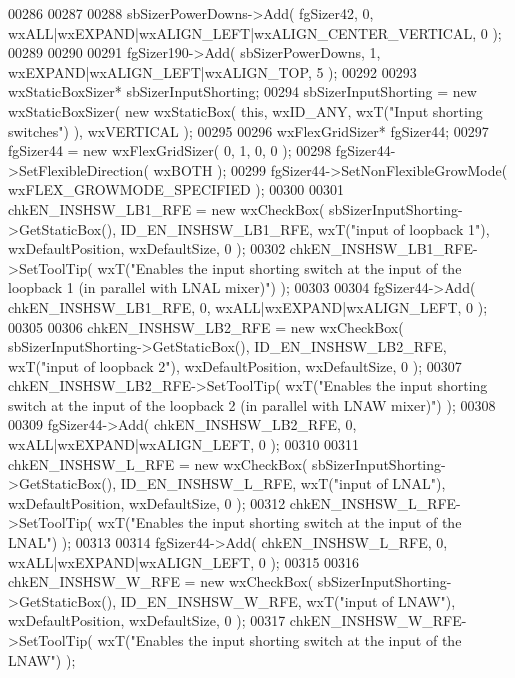 \begin{DoxyCode}
00286     
00287     
00288     sbSizerPowerDowns->Add( fgSizer42, 0, wxALL|wxEXPAND|wxALIGN\_LEFT|wxALIGN\_CENTER\_VERTICAL, 0 );
00289     
00290     
00291     fgSizer190->Add( sbSizerPowerDowns, 1, wxEXPAND|wxALIGN\_LEFT|wxALIGN\_TOP, 5 );
00292     
00293     wxStaticBoxSizer* sbSizerInputShorting;
00294     sbSizerInputShorting = \textcolor{keyword}{new} wxStaticBoxSizer( \textcolor{keyword}{new} wxStaticBox( \textcolor{keyword}{this}, wxID\_ANY, wxT(\textcolor{stringliteral}{"Input shorting
       switches"}) ), wxVERTICAL );
00295     
00296     wxFlexGridSizer* fgSizer44;
00297     fgSizer44 = \textcolor{keyword}{new} wxFlexGridSizer( 0, 1, 0, 0 );
00298     fgSizer44->SetFlexibleDirection( wxBOTH );
00299     fgSizer44->SetNonFlexibleGrowMode( wxFLEX\_GROWMODE\_SPECIFIED );
00300     
00301     chkEN_INSHSW_LB1_RFE = \textcolor{keyword}{new} wxCheckBox( sbSizerInputShorting->GetStaticBox(), 
      ID_EN_INSHSW_LB1_RFE, wxT(\textcolor{stringliteral}{"input of loopback 1"}), wxDefaultPosition, wxDefaultSize, 0 );
00302     chkEN_INSHSW_LB1_RFE->SetToolTip( wxT(\textcolor{stringliteral}{"Enables the input shorting switch at the input  of the loopback
       1 (in parallel with LNAL mixer)"}) );
00303     
00304     fgSizer44->Add( chkEN_INSHSW_LB1_RFE, 0, wxALL|wxEXPAND|wxALIGN\_LEFT, 0 );
00305     
00306     chkEN_INSHSW_LB2_RFE = \textcolor{keyword}{new} wxCheckBox( sbSizerInputShorting->GetStaticBox(), 
      ID_EN_INSHSW_LB2_RFE, wxT(\textcolor{stringliteral}{"input of loopback 2"}), wxDefaultPosition, wxDefaultSize, 0 );
00307     chkEN_INSHSW_LB2_RFE->SetToolTip( wxT(\textcolor{stringliteral}{"Enables the input shorting switch at the input  of the loopback
       2 (in parallel with LNAW mixer)"}) );
00308     
00309     fgSizer44->Add( chkEN_INSHSW_LB2_RFE, 0, wxALL|wxEXPAND|wxALIGN\_LEFT, 0 );
00310     
00311     chkEN_INSHSW_L_RFE = \textcolor{keyword}{new} wxCheckBox( sbSizerInputShorting->GetStaticBox(), 
      ID_EN_INSHSW_L_RFE, wxT(\textcolor{stringliteral}{"input of LNAL"}), wxDefaultPosition, wxDefaultSize, 0 );
00312     chkEN_INSHSW_L_RFE->SetToolTip( wxT(\textcolor{stringliteral}{"Enables the input shorting switch at the input  of the LNAL"}) );
00313     
00314     fgSizer44->Add( chkEN_INSHSW_L_RFE, 0, wxALL|wxEXPAND|wxALIGN\_LEFT, 0 );
00315     
00316     chkEN_INSHSW_W_RFE = \textcolor{keyword}{new} wxCheckBox( sbSizerInputShorting->GetStaticBox(), 
      ID_EN_INSHSW_W_RFE, wxT(\textcolor{stringliteral}{"input of LNAW"}), wxDefaultPosition, wxDefaultSize, 0 );
00317     chkEN_INSHSW_W_RFE->SetToolTip( wxT(\textcolor{stringliteral}{"Enables the input shorting switch at the input  of the LNAW"}) );

\end{DoxyCode}
